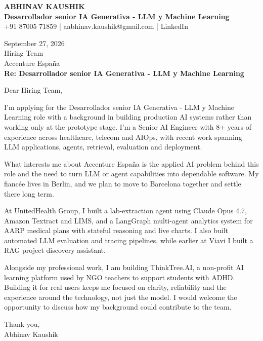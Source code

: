 \documentclass[10pt,a4paper]{article}
\begin{document}
\begin{center}
{\Large\bfseries ABHINAV KAUSHIK}\\[2pt]
{\bfseries Desarrollador senior IA Generativa - LLM y Machine Learning}\\[2pt]
+91 87005 71859 \quad | \quad aabhinav.kaushik@gmail.com \quad | \quad LinkedIn
\end{center}
\vspace{8pt}
September 27, 2026\\[6pt]
Hiring Team\\
Accenture España\\[4pt]
\textbf{Re: Desarrollador senior IA Generativa - LLM y Machine Learning}

Dear Hiring Team,

I’m applying for the Desarrollador senior IA Generativa - LLM y Machine Learning role with a background in building production AI systems rather than working only at the prototype stage. I’m a Senior AI Engineer with 8+ years of experience across healthcare, telecom and AIOps, with recent work spanning LLM applications, agents, retrieval, evaluation and deployment.

What interests me about Accenture España is the applied AI problem behind this role and the need to turn LLM or agent capabilities into dependable software. My fiancée lives in Berlin, and we plan to move to Barcelona together and settle there long term.

At UnitedHealth Group, I built a lab-extraction agent using Claude Opus 4.7, Amazon Textract and LIMS, and a LangGraph multi-agent analytics system for AARP medical plans with stateful reasoning and live charts. I also built automated LLM evaluation and tracing pipelines, while earlier at Viavi I built a RAG project discovery assistant.

Alongside my professional work, I am building ThinkTree.AI, a non-profit AI learning platform used by NGO teachers to support students with ADHD. Building it for real users keeps me focused on clarity, reliability and the experience around the technology, not just the model. I would welcome the opportunity to discuss how my background could contribute to the team.

Thank you,\\
Abhinav Kaushik
\end{document}
